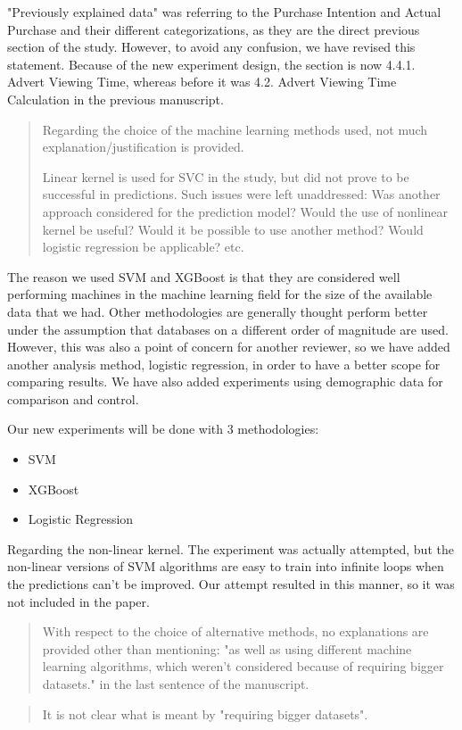 \documentclass[review]{elsarticle}
\begin{document}
"Previously explained data" was referring to the Purchase Intention and Actual Purchase and their different categorizations, as they are the direct previous section of the study. However, to avoid any confusion, we have revised this statement. Because of the new experiment design, the section is now 4.4.1. Advert Viewing Time, whereas before it was 4.2. Advert Viewing Time Calculation in the previous manuscript.

\begin{quotation}
Regarding the choice of the machine learning methods used, not much explanation/justification is provided. 

Linear kernel is used for SVC in the study, but did not prove to be successful in predictions. Such issues were left unaddressed: Was another approach considered for the prediction model? Would the use of nonlinear kernel be useful? Would it be possible to use another method? Would logistic regression be applicable? etc.
\end{quotation}

The reason we used SVM and XGBoost is that they are considered well performing machines in the machine learning field for the size of the available data that we had. Other methodologies are generally thought perform better under the assumption that databases on a different order of magnitude are used. However, this was also a point of concern for another reviewer, so we have added another analysis method, logistic regression, in order to have a better scope for comparing results. We have also added experiments using demographic data for comparison and control. 

Our new experiments will be done with 3 methodologies:
\begin{itemize}
    \item SVM
    \item XGBoost
    \item Logistic Regression
\end{itemize}

Regarding the non-linear kernel. The experiment was actually attempted, but the non-linear versions of SVM algorithms are easy to train into infinite loops when the predictions can't be improved. Our attempt resulted in this manner, so it was not included in the paper. 

\begin{quotation}
With respect to the choice of alternative methods, no explanations are provided other than mentioning: "as well as using different machine learning algorithms, which weren’t considered because of requiring bigger datasets." in the last sentence of the manuscript. 
\end{quotation}
\begin{quotation}
It is not clear what is meant by "requiring bigger datasets". 
\end{quotation}
\end{document}
